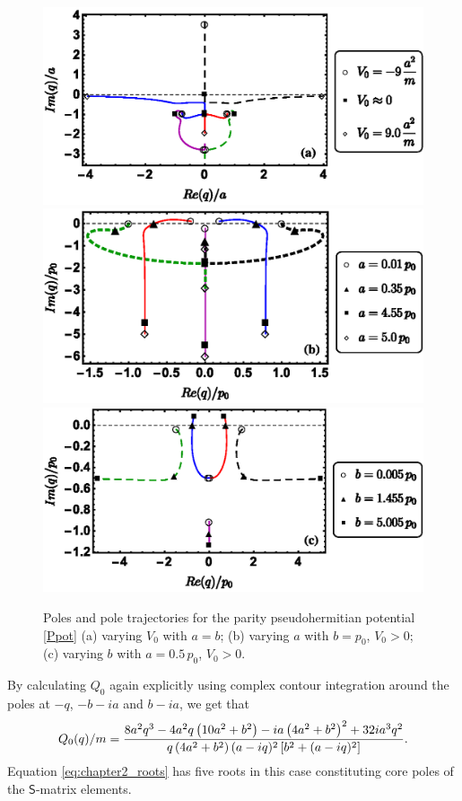 \begin{figure}[h]
\centering
\includegraphics[width=0.75\linewidth]{Figures/IVSymEigenvalsVaryingV0new.eps}
\includegraphics[width=0.75\linewidth]{Figures/IVSymEigenvalsVaryinganew.eps}
\includegraphics[width=0.75\linewidth]{Figures/IVSymEigenvalsVaryingbnew.eps}
\caption{ Poles and pole trajectories for the parity pseudohermitian potential \eqref{Ppot} (a) varying $V_0$ with $a=b$; (b) varying $a$ with $b=p_0$, $V_0>0$; (c) varying $b$ with $a=0.5\, p_0$, $V_0>0$.}
\label{fig:IVSymEigenvals}
\end{figure}



By calculating $Q_{0}$ again explicitly using complex contour integration around the poles at $-q$, $-b-i a$ and $b-i a$, we get that
%
\begin{equation}
Q_{0}(q)/m
=
\frac{8 a^2 q^3-4 a^2 q \left(10 a^2+b^2\right)-i a \left(4 a^2+b^2\right)^2+32 i a^3 q^2}{q \left(4 a^2+b^2\right) (a-i q)^2 \left[b^2+(a-i q)^2\right]}.
\nonumber\\
\end{equation}
%
Equation \eqref{eq:chapter2_roots} has five roots in this case constituting core poles of the $\mathsf{S}$-matrix elements.

